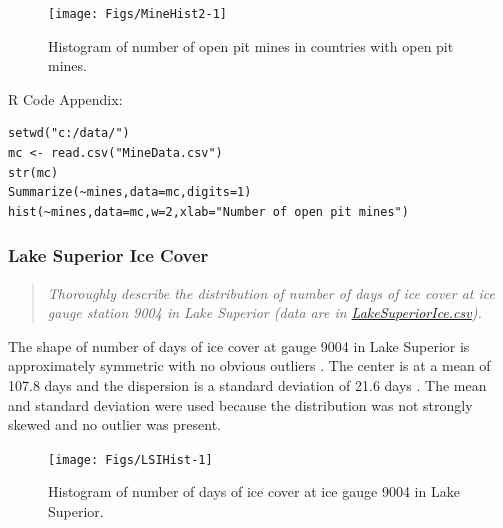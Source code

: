 \documentclass[10pt,openany]{book}\usepackage[]{graphicx}\usepackage[]{color}
\makeatletter
\newenvironment{kframe}{%
 \def\at@end@of@kframe{}%
 \ifinner\ifhmode%
  \def\at@end@of@kframe{\end{minipage}}%
  \begin{minipage}{\columnwidth}%
 \fi\fi%
 \def\FrameCommand##1{\hskip\@totalleftmargin \hskip-\fboxsep
 \colorbox{shadecolor}{##1}\hskip-\fboxsep
     \hskip-\linewidth \hskip-\@totalleftmargin \hskip\columnwidth}%
 \MakeFramed {\advance\hsize-\width
   \@totalleftmargin\z@ \linewidth\hsize
   \@setminipage}}%
 {\par\unskip\endMakeFramed%
 \at@end@of@kframe}
\newenvironment{knitrout}{}{} %
\makeatother
\begin{document}
\begin{knitrout}
\color{fgcolor}\begin{figure}[hbtp]

{\centering \texttt{[image: Figs/MineHist2-1]} 

}

\caption[Histogram of number of open pit mines in countries with open pit mines]{Histogram of number of open pit mines in countries with open pit mines.}\label{fig:MineHist2}
\end{figure}


\end{knitrout}

\begin{minipage}{\textwidth}
R Code Appendix:
\begin{knitrout}
\color{fgcolor}\begin{kframe}
\begin{verbatim}
setwd("c:/data/")
mc <- read.csv("MineData.csv")
str(mc)
Summarize(~mines,data=mc,digits=1)
hist(~mines,data=mc,w=2,xlab="Number of open pit mines")
\end{verbatim}
\end{kframe}
\end{knitrout}
\end{minipage}


\subsubsection{Lake Superior Ice Cover}
\begin{quote}
\textit{Thoroughly describe the distribution of number of days of ice cover at ice gauge station 9004 in Lake Superior (data are in \href{https://raw.githubusercontent.com/droglenc/NCData/master/LakeSuperiorIce.csv}{LakeSuperiorIce.csv}).}
\end{quote}



The shape of number of days of ice cover at gauge 9004 in Lake Superior is approximately symmetric with no obvious outliers . The center is at a mean of 107.8 days and the dispersion is a standard deviation of 21.6 days . The mean and standard deviation were used because the distribution was not strongly skewed and no outlier was present.

\begin{knitrout}
\color{fgcolor}\begin{figure}[hbtp]

{\centering \texttt{[image: Figs/LSIHist-1]} 

}

\caption[Histogram of number of days of ice cover at ice gauge 9004 in Lake Superior]{Histogram of number of days of ice cover at ice gauge 9004 in Lake Superior.}\label{fig:LSIHist}
\end{figure}


\end{knitrout}
\end{document}
